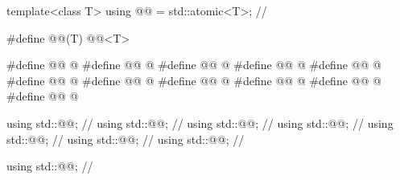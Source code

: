 \begin{codeblock}
template<class T>
  using @@ = std::atomic<T>;        // \expos

#define @@(T) @@<T>

#define @@ @\seebelow@
#define @@ @\seebelow@
#define @@ @\seebelow@
#define @@ @\seebelow@
#define @@ @\seebelow@
#define @@ @\seebelow@
#define @@ @\seebelow@
#define @@ @\seebelow@
#define @@ @\seebelow@
#define @@ @\seebelow@
#define @@ @\seebelow@

using std::@@;             // \seebelow
using std::@@;     // \seebelow
using std::@@;     // \seebelow
using std::@@;     // \seebelow
using std::@@;     // \seebelow
using std::@@;     // \seebelow
using std::@@;     // \seebelow

using std::@@;              // \seebelow


\end{codeblock}
